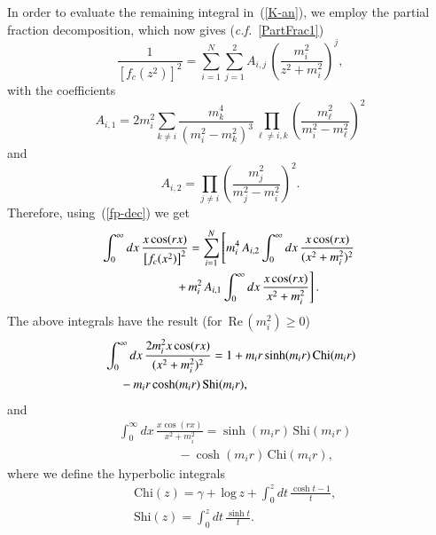 \documentclass[aps,prd,a4paper,twocolumn,showpacs,showkeys,preprintnumbers,amsmath,amssymb,nofootinbib]{revtex4-2}
\numberwithin{equation}{section}
\def\beq{\begin{equation}}
\def\eeq{\end{equation}}
\def\ln{\,\mbox{log}\,}
\renewcommand{\Re}{\,\mbox{Re}\,}
\newcommand{\eq}[1]{(\ref{#1})}
\newcommand{\n}[1]{\label{#1}}
\def\ga{\gamma}
\begin{document}
%
In order to evaluate the remaining integral in~\eq{K-an}, we employ the partial fraction decomposition, which now gives (\textit{c.f.}~\eqref{PartFrac1})
\begin{equation}
\n{fp-dec}
\frac{1}{\left[ f_c (z^2)\right] ^2} = \sum_{i=1}^N \sum_{j=1}^2 A_{i,j} \, \left( \frac{m_i^2}{z^2+m_i^2} \right)^j
,
\end{equation}
with the coefficients
\begin{equation}
A_{i,1} = 2 m_i^2 \sum_{k \neq i} \frac{ m_k^4}{(m_i^2 - m_k^2)^3} \prod_{\ell \neq i, k} \left( \frac{m_\ell^2}{m_i^2 - m_\ell^2} \right)^2
\end{equation}
and
\begin{equation}
A_{i,2} =  \prod_{j \neq i} \left( \frac{m_j^2}{m_j^2 - m_i^2} \right)^2.
\end{equation}
Therefore, using~\eq{fp-dec} we get 
\beq \label{617}
\begin{split}
& \hspace{-1mm}
\int_0^\infty dx \, \frac{x \cos (rx)}{\left[ f_c (x^2) \right] ^2}
=  \sum_{i=1}^N \left[ m_i^4\, A_{i,2} \int_0^\infty dx \, \frac{x \cos (rx)}{(x^2+m_i^2)^2} 
\right. \\
& \hspace{2cm} \left. + \, m_i^2\, A_{i,1} \int_0^\infty dx \, \frac{x \cos (rx)}{x^2+m_i^2}
\right].
\end{split}
\eeq
The above integrals have the result (for $\Re (m_i^2) \geqslant 0$)~\cite{book2} 
\beq
\begin{split}
\n{Raabe}
&
\int_0^\infty dx \, \frac{2 m_i^2 x \cos (rx)}{(x^2+m_i^2)^2} = 1
+ m_i r  \sinh (m_i r) \,\text{Chi}(m_i r)
\\
& \hspace{0.45cm}
- m_i r \cosh (m_i r) \,\text{Shi}(m_i r)
,
\end{split}
\eeq
and
\beq
\begin{split}
\n{Raabe2}
&
\int_0^\infty dx \, \frac{x \cos (rx)}{x^2+m_i^2} =  \sinh (m_ir) \, \text{Shi}(m_ir)
\\
& \hspace{2cm}
- \cosh (m_ir) \, \text{Chi}(m_ir)
,
\end{split}
\eeq
where we define the hyperbolic integrals
\begin{align}
&\mbox{Chi} (z) =  \ga + \ln z + \int_0^z dt\, \frac{\cosh t - 1}{t} 
,
\\
&\mbox{Shi} (z) = \int_0^z dt\, \frac{\sinh t}{t}.
\end{align}
\end{document}
